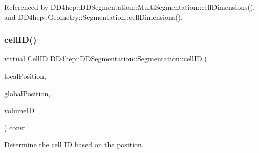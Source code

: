 Referenced by D\+D4hep\+::\+D\+D\+Segmentation\+::\+Multi\+Segmentation\+::cell\+Dimensions(), and D\+D4hep\+::\+Geometry\+::\+Segmentation\+::cell\+Dimensions().

\hypertarget{class_d_d4hep_1_1_d_d_segmentation_1_1_segmentation_ad5a60953d96d409850d8192f64f8ce3c}{}\label{class_d_d4hep_1_1_d_d_segmentation_1_1_segmentation_ad5a60953d96d409850d8192f64f8ce3c} 
\subsubsection{\texorpdfstring{cell\+I\+D()}{cellID()}}
{\footnotesize\ttfamily virtual \hyperlink{namespace_d_d4hep_1_1_d_d_segmentation_ac7af071d85cb48820914434a07e21ba1}{Cell\+ID} D\+D4hep\+::\+D\+D\+Segmentation\+::\+Segmentation\+::cell\+ID (\begin{DoxyParamCaption}\item[{const \hyperlink{struct_d_d4hep_1_1_d_d_segmentation_1_1_vector3_d}{Vector3D} \&}]{local\+Position,  }\item[{const \hyperlink{struct_d_d4hep_1_1_d_d_segmentation_1_1_vector3_d}{Vector3D} \&}]{global\+Position,  }\item[{const \hyperlink{namespace_d_d4hep_1_1_d_d_segmentation_a61a6833a18d1800bdef176595f83e3ba}{Volume\+ID} \&}]{volume\+ID }\end{DoxyParamCaption}) const\hspace{0.3cm}{\ttfamily [pure virtual]}}



Determine the cell ID based on the position. 



